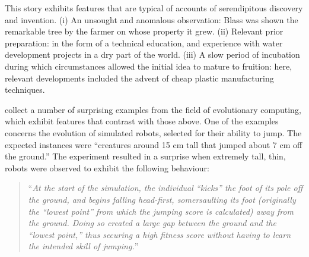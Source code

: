

This story exhibits features that are typical of accounts of serendipitous discovery and invention. (i) An unsought and anomalous observation: Blass was shown the remarkable tree by the farmer on whose property it grew. (ii) Relevant prior preparation: in the form of a technical education, and experience with water development projects in a dry part of the world.  (iii) A slow period of incubation during which circumstances allowed the initial idea to mature to fruition: here, relevant developments included the advent of cheap plastic manufacturing techniques.

\citet{alife2018cases} collect a number of surprising examples from the field of evolutionary computing, which exhibit features that contrast with those above.  One of the examples concerns the evolution of simulated robots, selected for their ability to jump.  The expected instances were ``creatures around 15 cm tall that jumped about 7 cm off the ground.''  The experiment resulted in a surprise when extremely tall, thin, robots were observed to exhibit the following behaviour:
\begin{quote}
``\emph{At the start of the simulation, the individual “kicks” the foot of its pole off the ground, and begins falling head-first, somersaulting its foot (originally the “lowest point” from which the jumping score is calculated) away from the ground. Doing so created a large gap between the ground and the “lowest point,” thus securing a high fitness score without having to learn the intended skill of jumping.}''
\end{quote}

